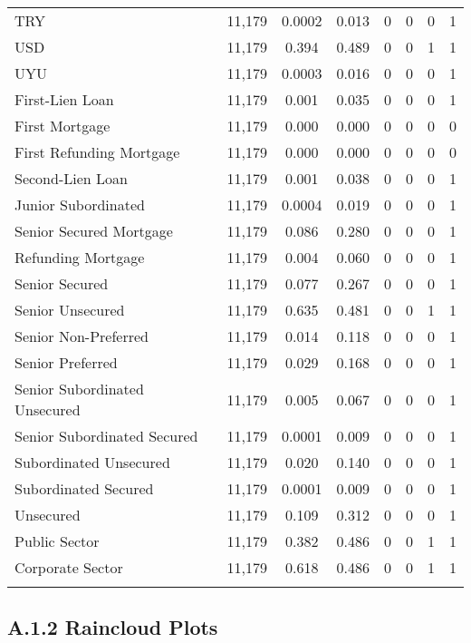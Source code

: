 \begin{table}[!htbp]
\begin{tabular}{@{\extracolsep{5pt}}lccccccc}
TRY & 11,179 & 0.0002 & 0.013 & 0 & 0 & 0 & 1 \\ 
USD & 11,179 & 0.394 & 0.489 & 0 & 0 & 1 & 1 \\ 
UYU & 11,179 & 0.0003 & 0.016 & 0 & 0 & 0 & 1 \\ 
First-Lien Loan & 11,179 & 0.001 & 0.035 & 0 & 0 & 0 & 1 \\ 
First Mortgage & 11,179 & 0.000 & 0.000 & 0 & 0 & 0 & 0 \\ 
First Refunding Mortgage & 11,179 & 0.000 & 0.000 & 0 & 0 & 0 & 0 \\ 
Second-Lien Loan & 11,179 & 0.001 & 0.038 & 0 & 0 & 0 & 1 \\ 
Junior Subordinated & 11,179 & 0.0004 & 0.019 & 0 & 0 & 0 & 1 \\ 
Senior Secured Mortgage & 11,179 & 0.086 & 0.280 & 0 & 0 & 0 & 1 \\ 
Refunding Mortgage & 11,179 & 0.004 & 0.060 & 0 & 0 & 0 & 1 \\ 
Senior Secured & 11,179 & 0.077 & 0.267 & 0 & 0 & 0 & 1 \\ 
Senior Unsecured & 11,179 & 0.635 & 0.481 & 0 & 0 & 1 & 1 \\ 
Senior Non-Preferred & 11,179 & 0.014 & 0.118 & 0 & 0 & 0 & 1 \\ 
Senior Preferred & 11,179 & 0.029 & 0.168 & 0 & 0 & 0 & 1 \\ 
Senior Subordinated Unsecured & 11,179 & 0.005 & 0.067 & 0 & 0 & 0 & 1 \\ 
Senior Subordinated Secured & 11,179 & 0.0001 & 0.009 & 0 & 0 & 0 & 1 \\ 
Subordinated Unsecured & 11,179 & 0.020 & 0.140 & 0 & 0 & 0 & 1 \\ 
Subordinated Secured & 11,179 & 0.0001 & 0.009 & 0 & 0 & 0 & 1 \\ 
Unsecured & 11,179 & 0.109 & 0.312 & 0 & 0 & 0 & 1 \\ 
Public Sector & 11,179 & 0.382 & 0.486 & 0 & 0 & 1 & 1 \\ 
Corporate Sector & 11,179 & 0.618 & 0.486 & 0 & 0 & 1 & 1 \\ 
\hline \\[-1.8ex] 
\end{tabular} 
\end{table} 
\newpage

\subsection{A.1.2 Raincloud Plots}


